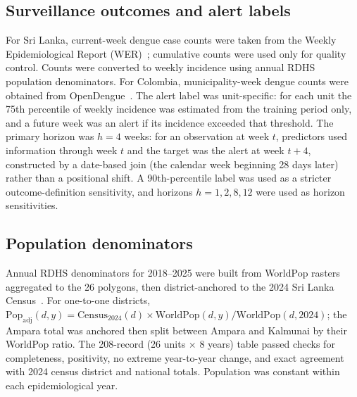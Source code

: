 \documentclass[11pt,a4paper]{article}
\begin{document}
\subsection{Surveillance outcomes and alert labels}
For Sri Lanka, current-week dengue case counts were taken from the Weekly Epidemiological Report (WER)~\cite{SriLankaWER}; cumulative counts were used only for quality control. Counts were converted to weekly incidence using annual RDHS population denominators. For Colombia, municipality-week dengue counts were obtained from OpenDengue~\cite{Clarke2024OpenDengue,OpenDengue2024}. The alert label was unit-specific: for each unit the 75th percentile of weekly incidence was estimated from the training period only, and a future week was an alert if its incidence exceeded that threshold. The primary horizon was $h=4$ weeks: for an observation at week $t$, predictors used information through week $t$ and the target was the alert at week $t+4$, constructed by a date-based join (the calendar week beginning 28 days later) rather than a positional shift. A 90th-percentile label was used as a stricter outcome-definition sensitivity, and horizons $h=1,2,8,12$ were used as horizon sensitivities.

\subsection{Population denominators}
Annual RDHS denominators for 2018--2025 were built from WorldPop rasters~\cite{Tatem2017,WorldPop2025} aggregated to the 26 polygons, then district-anchored to the 2024 Sri Lanka Census~\cite{SriLankaCensus2025}. For one-to-one districts, $\mathrm{Pop}_{\mathrm{adj}}(d,y)=\mathrm{Census}_{2024}(d)\times \mathrm{WorldPop}(d,y)/\mathrm{WorldPop}(d,2024)$; the Ampara total was anchored then split between Ampara and Kalmunai by their WorldPop ratio. The 208-record (26 units $\times$ 8 years) table passed checks for completeness, positivity, no extreme year-to-year change, and exact agreement with 2024 census district and national totals. Population was constant within each epidemiological year.
\end{document}
